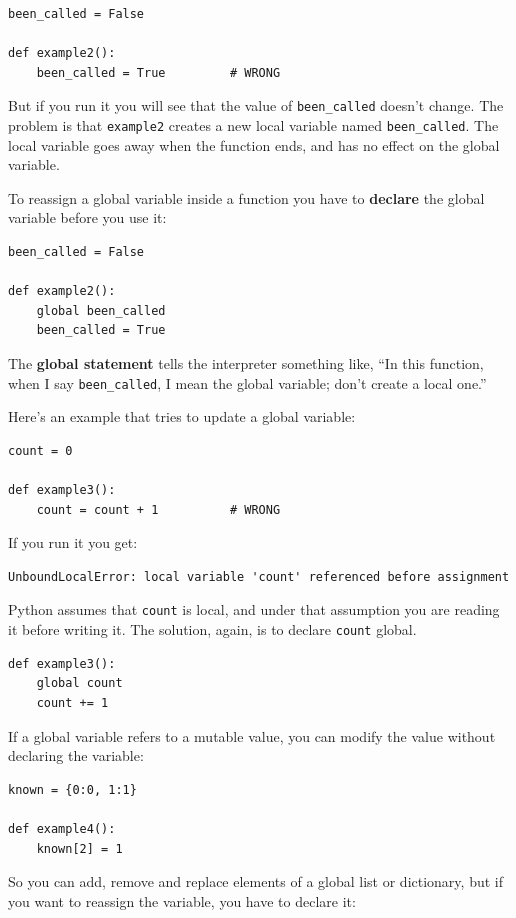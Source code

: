 \documentclass[10pt]{book}
\begin{document}
\begin{verbatim}
been_called = False

def example2():
    been_called = True         # WRONG
\end{verbatim}
%
But if you run it you will see that the value of \verb"been_called"
doesn't change.  The problem is that {\tt example2} creates a new local
variable named \verb"been_called".  The local variable goes away when
the function ends, and has no effect on the global variable.

To reassign a global variable inside a function you have to
{\bf declare} the global variable before you use it:

\begin{verbatim}
been_called = False

def example2():
    global been_called 
    been_called = True
\end{verbatim}
%
The {\bf global statement} tells the interpreter
something like, ``In this function, when I say \verb"been_called", I
mean the global variable; don't create a local one.''

Here's an example that tries to update a global variable:

\begin{verbatim}
count = 0

def example3():
    count = count + 1          # WRONG
\end{verbatim}
%
If you run it you get:

\begin{verbatim}
UnboundLocalError: local variable 'count' referenced before assignment
\end{verbatim}
%
Python assumes that {\tt count} is local, and under that assumption
you are reading it before writing it.  The solution, again,
is to declare {\tt count} global.

\begin{verbatim}
def example3():
    global count
    count += 1
\end{verbatim}
%
If a global variable refers to a mutable value, you can modify
the value without declaring the variable:

\begin{verbatim}
known = {0:0, 1:1}

def example4():
    known[2] = 1
\end{verbatim}
%
So you can add, remove and replace elements of a global list or
dictionary, but if you want to reassign the variable, you
have to declare it:
\end{document}

